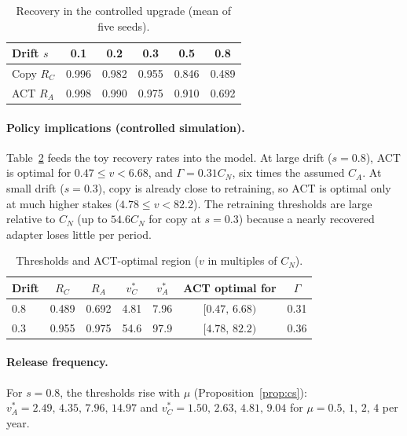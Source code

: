 \documentclass[preprint,12pt,authoryear]{elsarticle}
\begin{document}
\begin{table}[t]
\centering
\caption{Recovery in the controlled upgrade (mean of five seeds).}\label{tab:toy}
\begin{tabular}{lccccc}
\toprule
Drift $s$ & 0.1 & 0.2 & 0.3 & 0.5 & 0.8\\
\midrule
Copy $R_C$ & 0.996 & 0.982 & 0.955 & 0.846 & 0.489\\
ACT $R_A$ & 0.998 & 0.990 & 0.975 & 0.910 & 0.692\\
\bottomrule
\end{tabular}
\end{table}

\paragraph{Policy implications (controlled simulation).} Table~\ref{tab:policy} feeds the toy recovery rates into the model. At large drift
($s=0.8$), ACT is optimal for $0.47\le v<6.68$, and $\Gamma=0.31C_N$, six times the assumed $C_A$. At small drift
($s=0.3$), copy is already close to retraining, so ACT is optimal only at much higher stakes ($4.78\le v<82.2$).
The retraining thresholds are large relative to $C_N$ (up to $54.6C_N$ for copy at $s=0.3$) because a nearly
recovered adapter loses little per period.

\begin{table}[t]
\centering
\caption{Thresholds and ACT-optimal region ($v$ in multiples of $C_N$).}\label{tab:policy}
\begin{tabular}{lcccccc}
\toprule
Drift & $R_C$ & $R_A$ & $v^*_C$ & $v^*_A$ & ACT optimal for & $\Gamma$\\
\midrule
0.8 & 0.489 & 0.692 & 4.81 & 7.96 & $[0.47,\,6.68)$ & 0.31\\
0.3 & 0.955 & 0.975 & 54.6 & 97.9 & $[4.78,\,82.2)$ & 0.36\\
\bottomrule
\end{tabular}
\end{table}

\paragraph{Release frequency.} For $s=0.8$, the thresholds rise with $\mu$ (Proposition~\ref{prop:cs}):
$v^*_A=2.49,\,4.35,\,7.96,\,14.97$ and $v^*_C=1.50,\,2.63,\,4.81,\,9.04$ for $\mu=0.5,\,1,\,2,\,4$ per year.
\end{document}
